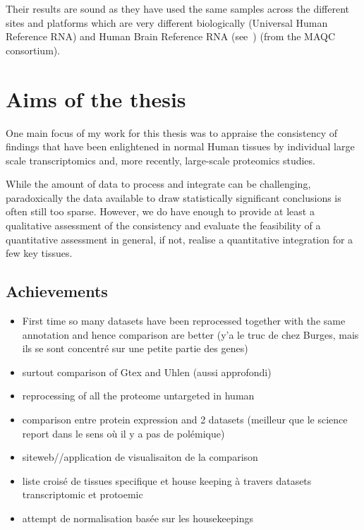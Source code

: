Their results are sound as they have used the same samples across the different
sites and platforms which are very different biologically (Universal
Human Reference RNA) and Human Brain Reference RNA
(see~) (from the \gls{MAQC} consortium).

\section*{Aims of the thesis}

One main focus of my work for this thesis was to appraise the
consistency of findings that have been enlightened in normal Human tissues by
individual large scale transcriptomics and, more recently, large-scale
proteomics studies.

While the amount of data to process and integrate can be challenging,
paradoxically the data available to draw statistically significant conclusions
is often still too sparse. However, we do have enough to provide at least a
qualitative assessment of the consistency and evaluate the feasibility of a
quantitative assessment in general, if not, realise a quantitative integration
for a few key tissues.

\subsection*{Achievements}
\begin{itemize}
    \item First time so many datasets have been reprocessed together with the
        same annotation and hence comparison are better (y'a le truc de chez Burges,
        mais ils se sont concentré sur une petite partie des genes)
    \item surtout comparison of Gtex and Uhlen (aussi approfondi)
    \item reprocessing of all the proteome untargeted in human
    \item comparison entre protein expression and 2 datasets (meilleur que le
        science report dans le sens où il y a pas de polémique)
    \item siteweb//application de visualisaiton de la comparison
    \item liste croisé de tissues specifique et house keeping à travers datasets
       transcriptomic et protoemic
  \item attempt de normalisation basée sur les housekeepings
\end{itemize}



